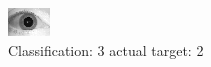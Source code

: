 \begin{figure}[h!]
\begin{center}
\includegraphics[width=0.60\columnwidth]{figures/ID1733_class_3_target_2.png}
\end{center}
\caption{ Classification: 3 actual target: 2}
\label{fig:ID1733_class_3_target_2}
\end{figure}
